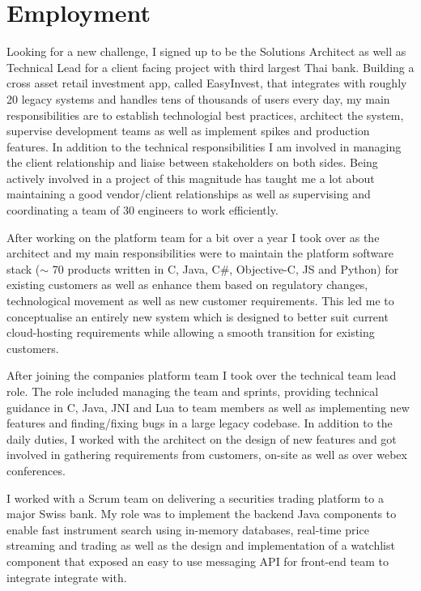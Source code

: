 \documentclass[11pt,a4paper]{my_cv}
\begin{document}
\section{Employment}
Looking for a new challenge, I signed up to be the Solutions Architect as well as Technical Lead for a client facing project with third largest Thai bank. Building a cross asset retail investment app, called EasyInvest, that integrates with roughly 20 legacy systems and handles tens of thousands of users every day, my main responsibilities are to establish technologial best practices, architect the system, supervise development teams as well as implement spikes and production features. In addition to the technical responsibilities I am involved in managing the client relationship and liaise between stakeholders on both sides. Being actively involved in a project of this magnitude has taught me a lot about maintaining a good vendor/client relationships as well as supervising and coordinating a team of 30 engineers to work efficiently.

After working on the platform team for a bit over a year I took over as the architect and my main responsibilities were to maintain the platform software stack ($\sim$ 70 products written in C, Java, C\#, Objective-C, JS and Python) for existing customers as well as enhance them based on regulatory changes, technological movement as well as new customer requirements. This led me to conceptualise an entirely new system which is designed to better suit current cloud-hosting requirements while allowing a smooth transition for existing customers.

After joining the companies platform team I took over the technical team lead role. The role included managing the team and sprints, providing technical guidance in C, Java, JNI and Lua to team members as well as implementing new features and finding/fixing bugs in a large legacy codebase. In addition to the daily duties, I worked with the architect on the design of new features and got involved in gathering requirements from customers, on-site as well as over webex conferences.

I worked with a Scrum team on delivering a securities trading platform to a major Swiss bank. My role was to implement the backend Java components to enable fast instrument search using in-memory databases, real-time price streaming and trading as well as the design and implementation of a watchlist component that exposed an easy to use messaging API for front-end team to integrate integrate with.
\end{document}
